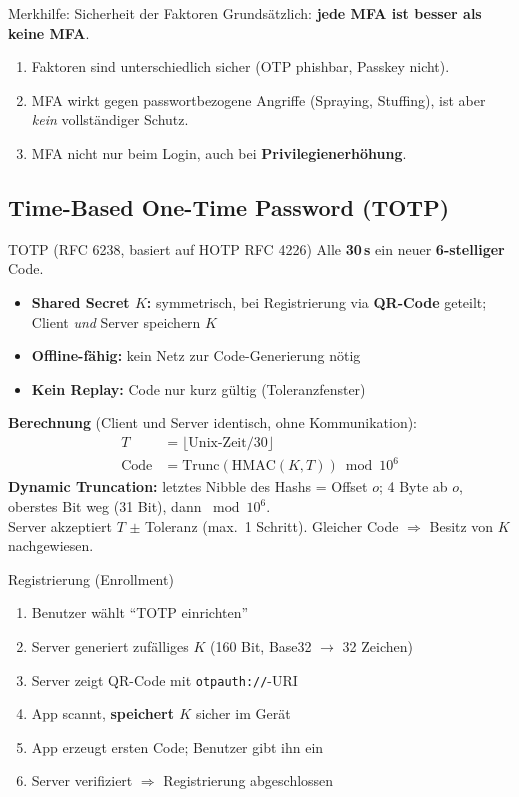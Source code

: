 \documentclass[a4paper, fontsize=7pt]{scrartcl}
\begin{document}
\begin{subbox}{Merkhilfe: Sicherheit der Faktoren}
Grundsätzlich: \textbf{jede MFA ist besser als keine MFA}.
\begin{enumerate}
    \item Faktoren sind unterschiedlich sicher (OTP phishbar, Passkey nicht).
    \item MFA wirkt gegen passwortbezogene Angriffe (Spraying, Stuffing),
          ist aber \emph{kein} vollständiger Schutz.
    \item MFA nicht nur beim Login, auch bei \textbf{Privilegienerhöhung}.
\end{enumerate}
\end{subbox}

\subsection{Time-Based One-Time Password (TOTP)}

\begin{mainbox}{TOTP (RFC 6238, basiert auf HOTP RFC 4226)}
Alle \textbf{30\,s} ein neuer \textbf{6-stelliger} Code.
\begin{itemize}
    \item \textbf{Shared Secret $K$:} symmetrisch, bei Registrierung via
          \textbf{QR-Code} geteilt; Client \emph{und} Server speichern $K$
    \item \textbf{Offline-fähig:} kein Netz zur Code-Generierung nötig
    \item \textbf{Kein Replay:} Code nur kurz gültig (Toleranzfenster)
\end{itemize}
\textbf{Berechnung} (Client und Server identisch, ohne Kommunikation):
\begin{align*}
T &= \lfloor \text{Unix-Zeit} / 30 \rfloor \\
\text{Code} &= \mathrm{Trunc}(\mathrm{HMAC}(K, T)) \bmod 10^6
\end{align*}
\textbf{Dynamic Truncation:} letztes Nibble des Hashs = Offset $o$; 4 Byte
ab $o$, oberstes Bit weg (31 Bit), dann $\bmod 10^6$.\\
Server akzeptiert $T$ $\pm$ Toleranz (max.\ 1 Schritt). Gleicher Code
$\Rightarrow$ Besitz von $K$ nachgewiesen.
\end{mainbox}

\begin{subbox}{Registrierung (Enrollment)}
\begin{enumerate}
    \item Benutzer wählt ``TOTP einrichten''
    \item Server generiert zufälliges $K$ (160 Bit, Base32 $\to$ 32 Zeichen)
    \item Server zeigt QR-Code mit \texttt{otpauth://}-URI
    \item App scannt, \textbf{speichert $K$} sicher im Gerät
    \item App erzeugt ersten Code; Benutzer gibt ihn ein
    \item Server verifiziert $\Rightarrow$ Registrierung abgeschlossen
\end{enumerate}
\end{subbox}
\end{document}
